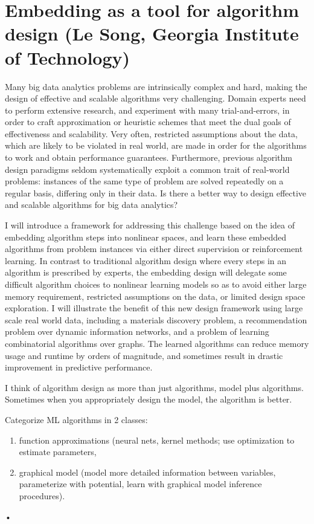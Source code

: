 \section{Embedding as a tool for algorithm design (Le Song, Georgia Institute of Technology)}
Many big data analytics problems are intrinsically complex and hard, making the design of effective and scalable algorithms very challenging. Domain experts need to perform extensive research, and experiment with many trial-and-errors, in order to craft approximation or heuristic schemes that meet the dual goals of effectiveness and scalability. Very often, restricted assumptions about the data, which are likely to be violated in real world, are made in order for the algorithms to work and obtain performance guarantees. Furthermore, previous algorithm design paradigms seldom systematically exploit a common trait of real-world problems: instances of the same type of problem are solved repeatedly on a regular basis, differing only in their data. Is there a better way to design effective and scalable algorithms for big data analytics?

I will introduce a framework for addressing this challenge based on the idea of embedding algorithm steps into nonlinear spaces, and learn these embedded algorithms from problem instances via either direct supervision or reinforcement learning. In contrast to traditional algorithm design where every steps in an algorithm is prescribed by experts, the embedding design will delegate some difficult algorithm choices to nonlinear learning models so as to avoid either large memory requirement, restricted assumptions on the data, or limited design space exploration. I will illustrate the benefit of this new design framework using large scale real world data, including a materials discovery problem, a recommendation problem over dynamic information networks, and a problem of learning combinatorial algorithms over graphs. The learned algorithms can reduce memory usage and runtime by orders of magnitude, and sometimes result in drastic improvement in predictive performance.

I think of algorithm design as more than just algorithms, model plus algorithms. Sometimes when you appropriately design the model, the algorithm is better. 

Categorize ML algorithms in 2 classes: 
\begin{enumerate}
\item
function approximations (neural nets, kernel methods; use optimization to estimate parameters,
\item
 graphical model (model more detailed information between variables, parameterize with potential, learn with graphical model inference procedures). 
\end{enumerate}•


